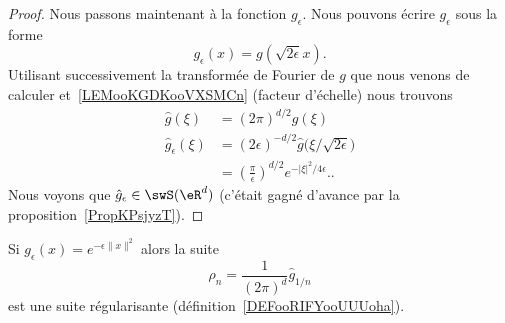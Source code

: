 \begin{proof}
	Nous passons maintenant à la fonction \( g_{\epsilon}\). Nous pouvons écrire \( g_{\epsilon}\) sous la forme
	\begin{equation}
		g_{\epsilon}(x)=g(\sqrt{ 2\epsilon }x).
	\end{equation}
	Utilisant successivement la transformée de Fourier de \( g\) que nous venons de calculer et~\ref{LEMooKGDKooVXSMCn} (facteur d'échelle) nous trouvons
	\begin{subequations}
		\begin{align}
			\hat g(\xi)            & =(2\pi)^{d/2}g(\xi)                                                                                   \\
			\hat g_{\epsilon}(\xi) & =(2\epsilon)^{-d/2}\hat g\big( \xi/\sqrt{ 2\epsilon } \big)                                           \\
			                       & =\left( \frac{ \pi }{ \epsilon } \right)^{d/2} e^{-| \xi |^2/4\epsilon} \label{SUBEQooFWIKooGMpFbo}..
		\end{align}
	\end{subequations}
	Nous voyons que \( \hat g_{\epsilon}\in\swS(\eR^d)\)  (c'était gagné d'avance par la proposition~\ref{PropKPsjyzT}).
\end{proof}

\begin{lemma}       \label{LEMooTDWSooSBJXdv}
	Si \( g_{\epsilon}(x)= e^{-\epsilon\| x \|^2}\) alors la suite
	\begin{equation}        \label{EQooWQWZooZIYGpq}
		\rho_n=\frac{1}{ (2\pi)^d }\hat g_{1/n}
	\end{equation}
	est une suite régularisante (définition~\ref{DEFooRIFYooUUUoha}).
\end{lemma}

